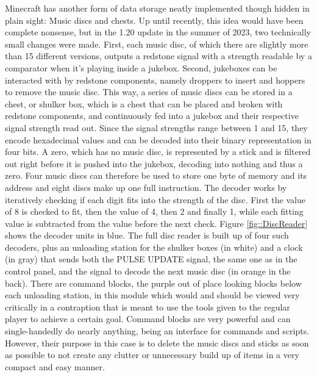 Minecraft has another form of data storage neatly implemented though hidden in plain sight: Music discs and chests. Up until recently, this idea would have been complete nonsense, but in the 1.20 update in the summer of 2023, two technically small changes were made. First, each music disc, of which there are slightly more than 15 different versions, outputs a redstone signal with a strength readable by a comparator when it's playing inside a jukebox. Second, jukeboxes can be interacted with by redstone components, namely droppers to insert and hoppers to remove the music disc. This way, a series of music discs can be stored in a chest, or shulker box, which is a chest that can be placed and broken with redstone components, and continuously fed into a jukebox and their respective signal strength read out. Since the signal strengths range between 1 and 15, they encode hexadecimal values and can be decoded into their binary representation in four bits. A zero, which has no music disc, is represented by a stick and is filtered out right before it is pushed into the jukebox, decoding into nothing and thus a zero. Four music discs can therefore be used to store one byte of memory and its address and eight discs make up one full instruction. The decoder works by iteratively checking if each digit fits into the strength of the disc. First the value of 8 is checked to fit, then the value of 4, then 2 and finally 1, while each fitting value is subtracted from the value before the next check. Figure \ref{fig::DiscReader} \space shows the decoder units in blue. The full disc reader is built up of four such decoders, plus an unloading station for the shulker boxes (in white) and a clock (in gray) that sends both the PULSE UPDATE signal, the same one as in the control panel, and the signal to decode the next music disc (in orange in the back). There are command blocks, the purple out of place looking blocks below each unloading station, in this module which would and should be viewed very critically in a contraption that is meant to use the tools given to the regular player to achieve a certain goal. Command blocks are very powerful and can single-handedly do nearly anything, being an interface for commands and scripts. However, their purpose in this case is to delete the music discs and sticks as soon as possible to not create any clutter or unnecessary build up of items in a very compact and easy manner.

